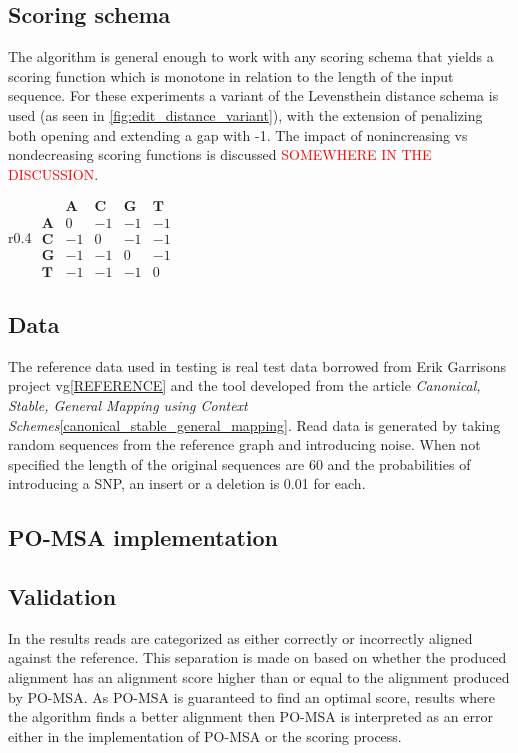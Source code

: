 \documentclass[thesis.tex]{subfiles}
\begin{document}
\subsection{Scoring schema}
The algorithm is general enough to work with any scoring schema that yields a scoring function which is monotone in relation to the length of the input sequence. For these experiments a variant of the Levensthein distance schema is used (as seen in \ref{fig:edit_distance_variant}), with the extension of penalizing both opening and extending a gap with -1. The impact of nonincreasing vs nondecreasing scoring functions is discussed \textcolor{red}{SOMEWHERE IN THE DISCUSSION}.
\begin{wrapfigure}{r}{0.4\textwidth}
	$
	\begin{array}{r|rrrr}
	 & \mathbf{A} & \mathbf{C} & \mathbf{G} & \mathbf{T} \\ \hline
	\mathbf{A} & 0 & -1 & -1 & -1 \\
	\mathbf{C} & -1 & 0 & -1 & -1 \\
	\mathbf{G} & -1 & -1 & 0 & -1 \\
	\mathbf{T} & -1 & -1 & -1 & 0
	\end{array}
	$
	\label{fig:edit_distance_variant}
	\caption{The scoring matrix used in the experiments}
\end{wrapfigure}
\subsection{Data}
The reference data used in testing is real test data borrowed from Erik Garrisons project vg\ref{REFERENCE} and the tool developed from the article \textit{Canonical, Stable, General Mapping using Context Schemes}\ref{canonical_stable_general_mapping}. Read data is generated by taking random sequences from the reference graph and introducing noise. When not specified the length of the original sequences are 60 and the probabilities of introducing a SNP, an insert or a deletion is 0.01 for each.
\subsection{PO-MSA implementation}
\subsection{Validation}
In the results reads are categorized as either correctly or incorrectly aligned against the reference. This separation is made on based on whether the produced alignment has an alignment score higher than or equal to the alignment produced by PO-MSA. As PO-MSA is guaranteed to find an optimal score, results where the algorithm finds a better alignment then PO-MSA is interpreted as an error either in the implementation of PO-MSA or the scoring process. 
\end{document}
